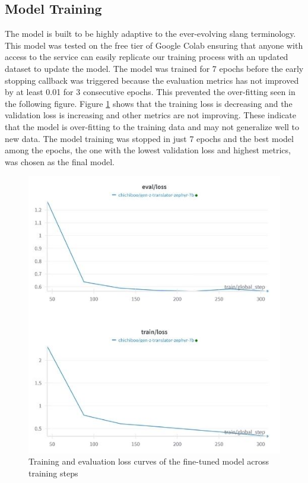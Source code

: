 \subsection{Model Training}
The model is built to be highly adaptive to the ever-evolving slang terminology. This model was tested on the free tier of Google Colab ensuring that anyone with access to the service can easily replicate our training process with an updated dataset to update the model.
The model was trained for 7 epochs before the early stopping callback was triggered because the evaluation metrics has not improved by at least 0.01 for 3 consecutive epochs. This prevented the over-fitting seen in the following figure. 
Figure \ref{fig:losses} shows that the training loss is decreasing and the validation loss is increasing and other metrics are not improving. These indicate that the model is over-fitting to the training data and may not generalize well to new data. The model training was stopped in just 7 epochs and the best model among the epochs, the one with the lowest validation loss and highest metrics, was chosen as the final model.
\begin{figure}[!htbp]
	\centering
	\includegraphics[scale=1]{figures/losses.jpg}
	\caption{Training and evaluation loss curves of the fine-tuned model across training steps}
	\label{fig:losses}
\end{figure}
